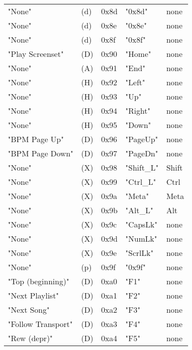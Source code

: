 \begin{table}[htb]
\begin{tabular}{l l l l l}
        "None"               & (d)  &  0x8d   & "0x8d"       & none \\
        "None"               & (d)  &  0x8e   & "0x8e"       & none \\
        "None"               & (d)  &  0x8f   & "0x8f"       & none \\
        "Play Screenset"     & (D)  &  0x90   & "Home"       & none \\
        "None"               & (A)  &  0x91   & "End"        & none \\
        "None"               & (H)  &  0x92   & "Left"       & none \\
        "None"               & (H)  &  0x93   & "Up"         & none \\
        "None"               & (H)  &  0x94   & "Right"      & none \\
        "None"               & (H)  &  0x95   & "Down"       & none \\
        "BPM Page Up"        & (D)  &  0x96   & "PageUp"     & none \\
        "BPM Page Down"      & (D)  &  0x97   & "PageDn"     & none \\
        "None"               & (X)  &  0x98   & "Shift\_L"   &  Shift \\
        "None"               & (X)  &  0x99   & "Ctrl\_L"    &  Ctrl \\
        "None"               & (X)  &  0x9a   & "Meta"       & Meta \\
        "None"               & (X)  &  0x9b   & "Alt\_L"     &  Alt \\
        "None"               & (X)  &  0x9c   & "CapsLk"     & none \\
        "None"               & (X)  &  0x9d   & "NumLk"      & none \\
        "None"               & (X)  &  0x9e   & "ScrlLk"     & none \\
        "None"               & (p)  &  0x9f   & "0x9f"       & none \\
        "Top (beginning)"    & (D)  &  0xa0   & "F1"         & none \\
        "Next Playlist"      & (D)  &  0xa1   & "F2"         & none \\
        "Next Song"          & (D)  &  0xa2   & "F3"         & none \\
        "Follow Transport"   & (D)  &  0xa3   & "F4"         & none \\
        "Rew (depr)"         & (D)  &  0xa4   & "F5"         & none \\

\end{tabular}
\end{table}
